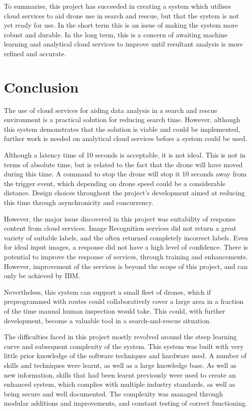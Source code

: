 \documentclass{article}
\begin{document}
To summarise, this project has succeeded in creating a system which utilises cloud services to aid drone use in search and rescue, but that the system is not yet ready for use. In the short term this is an issue of making the system more robust and durable. In the long term, this is a concern of awaiting machine learning and analytical cloud services to improve until resultant analysis is more refined and accurate.

\section{Conclusion}

The use of cloud services for aiding data analysis in a search and rescue environment is a practical solution for reducing search time. However, although this system demonstrates that the solution is viable and could be implemented, further work is needed on analytical cloud services before a system could be used. 

Although a latency time of 10 seconds is acceptable, it is not ideal. This is not in terms of absolute time, but is related to the fact that the drone will have moved during this time. A command to stop the drone will stop it 10 seconds away from the trigger event, which depending on drone speed could be a considerable distance. Design choices throughout the project's development aimed at reducing this time through asynchronicity and concurrency.

However, the major issue discovered in this project was suitability of response content from cloud services. Image Recognition services did not return a great variety of suitable labels, and the often returned completely incorrect labels. Even for ideal input images, a response did not have a high level of confidence. There is potential to improve the response of services, through training and enhancements. However, improvement of the services is beyond the scope of this project, and can only be achieved by IBM. 

Nevertheless, this system can support a small fleet of drones, which if preprogrammed with routes could collaboratively cover a large area in a fraction of the time manual human inspection would take. This could, with further development, become a valuable tool in a search-and-rescue situation. 

The difficulties faced in this project mostly revolved around the steep learning curve and subsequent complexity of the system. This system was built with very little prior knowledge of the software techniques and hardware used. A number of skills and techniques were learnt, as well as a large knowledge base. As well as new information, skills that had been learnt previously were used to create an enhanced system, which complies with multiple industry standards, as well as being secure and well documented. The complexity was managed through modular additions and improvements, and constant testing of correct functioning.
\end{document}
